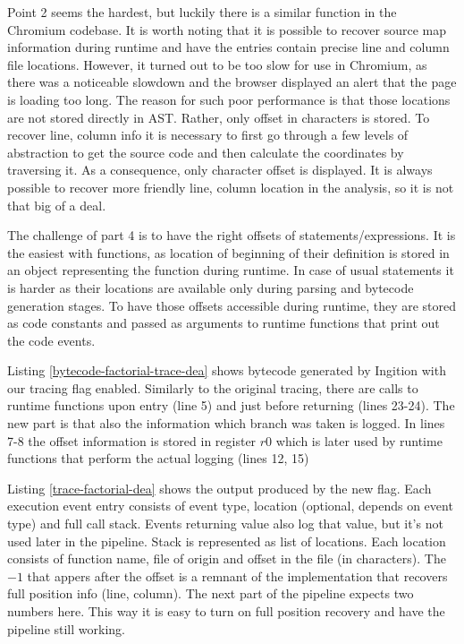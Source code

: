 Point 2 seems the hardest, but luckily there is a similar function in the Chromium codebase.
It is worth noting that it is possible to recover source map information during runtime
and have the entries contain precise line and column file locations. However, it turned out to be too slow
for use in Chromium, as there was a noticeable slowdown and the browser displayed an alert that
the page is loading too long.
The reason for such poor performance is that those locations are not stored directly in AST. Rather, only offset
in characters is stored. To recover line, column info it is necessary to first go through
a few levels of abstraction to get the source code and then calculate the coordinates by traversing it.
As a consequence, only character offset is displayed. It is always possible to recover more friendly
line, column location in the analysis, so it is not that big of a deal.

The challenge of part 4 is to have the right offsets of statements/expressions.
It is the easiest with functions, as location of beginning of their definition is stored in an 
object representing the function during runtime. In case of usual statements it is harder 
as their locations are available only during parsing and bytecode generation stages.
To have those offsets accessible during runtime, they are stored as code constants
and passed as arguments to runtime functions that print out the code events.

Listing \ref{bytecode-factorial-trace-dea} shows bytecode generated by Ingition with
our tracing flag enabled. Similarly to the original tracing, there are calls to runtime functions
upon entry (line 5) and just before returning (lines 23-24). 
The new part is that also the information which branch was taken is logged.
In lines 7-8 the offset information is stored in register $r0$ which is later used by runtime
functions that perform the actual logging (lines 12, 15)


		
Listing \ref{trace-factorial-dea} shows the output produced by the new flag. Each execution event
entry consists of event type, location (optional, depends on event type) and full call stack.
Events returning value also log that value, but it's not used later in the pipeline.
Stack is represented as list of locations. Each location consists
of function name, file of origin and offset in the file (in characters). The $-1$ that appers after
the offset is a remnant of the implementation that recovers full position info (line, column).
The next part of the pipeline expects two numbers here. This way it is easy to turn on full position recovery
and have the pipeline still working.


